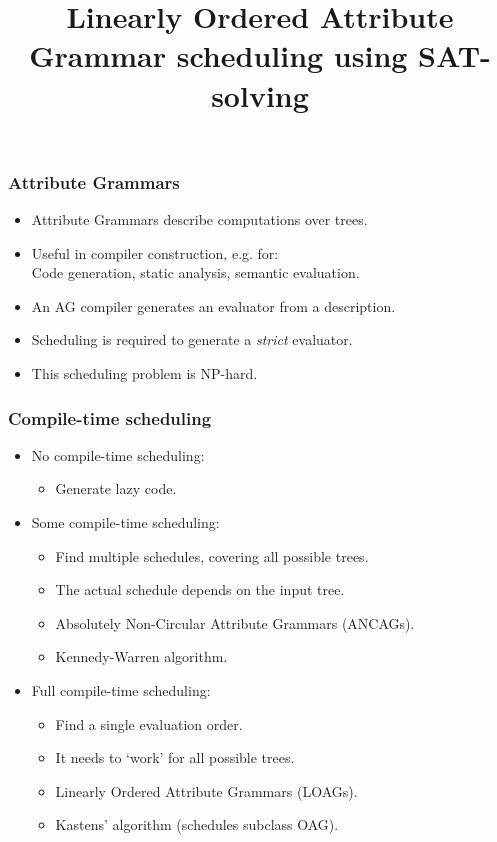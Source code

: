 \documentclass{beamer}
\title{Linearly Ordered Attribute Grammar scheduling using SAT-solving}
\begin{document}
\begin{frame}
    \maketitle
\end{frame}

\begin{frame}
    \frametitle{Attribute Grammars}
    \begin{itemize}
        \item Attribute Grammars describe computations over trees.
        \item Useful in compiler construction, e.g. for:\\
                Code generation, static analysis, semantic evaluation.
        \item An AG compiler generates an evaluator from a description.
        \item Scheduling is required to generate a \emph{strict} evaluator.
        \item This scheduling problem is NP-hard.
    \end{itemize}
\end{frame}

\begin{frame}
    \frametitle{Compile-time scheduling}
    \begin{itemize}
        \item No compile-time scheduling: 
            \begin{itemize}
                \item Generate lazy code.
            \end{itemize}
        \item Some compile-time scheduling: 
            \begin{itemize}
                \item Find multiple schedules, covering all possible trees.
                \item The actual schedule depends on the input tree.
                \item Absolutely Non-Circular Attribute Grammars (ANCAGs).
                \item Kennedy-Warren algorithm.
            \end{itemize}
        \item Full compile-time scheduling:
            \begin{itemize}
                \item Find a single evaluation order.
                \item It needs to `work' for all possible trees.
                \item Linearly Ordered Attribute Grammars (LOAGs).
                \item Kastens' algorithm (schedules subclass OAG).
            \end{itemize}
    \end{itemize}
\end{frame}
\end{document}
